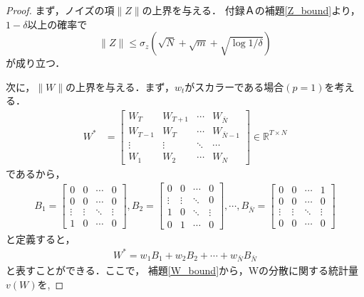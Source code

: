 \begin{proof}
まず，ノイズの項$\|Z\|$の上界を与える．
付録Ａの補題\ref{Z_bound}より，$1-\delta$以上の確率で
\begin{equation*}
    \|Z\| \leq \sigma_z(\sqrt{N} + \sqrt{m} + \sqrt{\log{1/  \delta}} )
\end{equation*}
が成り立つ．

次に，$\|W\|$の上界を与える．まず，$w_t$がスカラーである場合$(p = 1)$を考える．
\begin{align*}
    W^* &= 
    \begin{bmatrix}
        W_T     & W_{T+1} & \cdots & W_{\bar{N}} \\
        W_{T-1} & W_T     & \cdots & W_{\bar{N}-1} \\
        \vdots  & \vdots  & \ddots & \cdots \\
        W_1     & W_2     & \cdots & W_N
    \end{bmatrix}\in\mathbb{R}^{T \times N} 
\end{align*}
であるから，
\begin{align*}
    B_1 = 
    \begin{bmatrix}
        0 & 0 &\cdots & 0 \\
        0 & 0 &\cdots & 0 \\
        \vdots & \vdots & \ddots &\vdots\\
        1 & 0 & \cdots & 0
    \end{bmatrix}
    , B_2 = 
    \begin{bmatrix}
        0 & 0 &\cdots & 0 \\
        \vdots & \vdots &\ddots & 0 \\
        1 & 0 & \ddots &\vdots\\
        0 & 1 & \cdots & 0
    \end{bmatrix}, \cdots, B_{\bar{N}} = 
    \begin{bmatrix}
        0 & 0 &\cdots & 1 \\
        0 & 0 &\cdots & 0 \\
        \vdots & \vdots & \ddots &\vdots\\
        0 & 0 & \cdots & 0   
    \end{bmatrix}
\end{align*}
と定義すると，
\begin{align*}
    W^* = w_1B_1 + w_2B_2 + \cdots + w_{\bar{N}}B_{\bar{N}} 
\end{align*}
と表すことができる．ここで，
補題\ref{W_bound}から，Wの分散に関する統計量$v(W)$を,

\end{proof}
